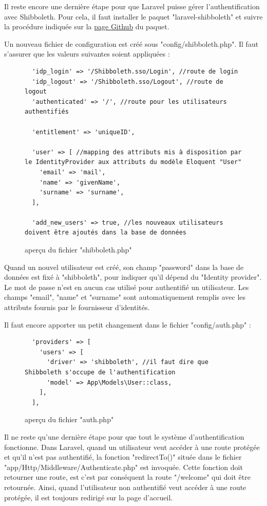 \documentclass[
    iai, %
    eai, %
]{heig-tb}
\begin{document}
Il reste encore une dernière étape pour que Laravel puisse gérer l'authentification avec Shibboleth. Pour cela, il faut installer le paquet "laravel-shibboleth" et suivre la procédure indiquée sur la \href{https://github.com/uabookstores/laravel-shibboleth}{page Github} du paquet.

Un nouveau fichier de configuration est créé sous "config/shibboleth.php". Il faut s'assurer que les valeurs suivantes soient appliquées :

\begin{figure}[h]
  \begin{verbatim}
  'idp_login' => '/Shibboleth.sso/Login', //route de login
  'idp_logout' => '/Shibboleth.sso/Logout', //route de logout
  'authenticated' => '/', //route pour les utilisateurs authentifiés

  'entitlement' => 'uniqueID',

  'user' => [ //mapping des attributs mis à disposition par le IdentityProvider aux attributs du modèle Eloquent "User"
    'email' => 'mail',
    'name' => 'givenName',
    'surname' => 'surname',
  ],

  'add_new_users' => true, //les nouveaux utilisateurs doivent être ajoutés dans la base de données
  \end{verbatim}
  \caption{aperçu du fichier "shibboleth.php"}
\end{figure}

Quand un nouvel utilisateur est créé, son champ "password" dans la base de données est fixé à "shibboleth", pour indiquer qu'il dépend du "Identity provider". Le mot de passe n'est en aucun cas utilisé pour authentifié un utilisateur. Les champs "email", "name" et "surname" sont automatiquement remplis avec les attributs fournis par le fournisseur d'identités.

\newpage
Il faut encore apporter un petit changement dans le fichier "config/auth.php" :

\begin{figure}[h]
  \begin{verbatim}
  'providers' => [
    'users' => [
      'driver' => 'shibboleth', //il faut dire que Shibboleth s'occupe de l'authentification
      'model' => App\Models\User::class,
    ],
  ],
  \end{verbatim}
  \caption{aperçu du fichier "auth.php"}
\end{figure}

Il ne reste qu'une dernière étape pour que tout le système d'authentification fonctionne. Dans Laravel, quand un utilisateur veut accéder à une route protégée et qu'il n'est pas authentifié, la fonction "redirectTo()" située dans le fichier "app/Http/Middleware/Authenticate.php" est invoquée. Cette fonction doit retourner une route, est c'est par conséquent la route "/welcome" qui doit être retournée. Ainsi, quand l'utilisateur non authentifié veut accéder à une route protégée, il est toujours redirigé sur la page d'accueil.
\end{document}
